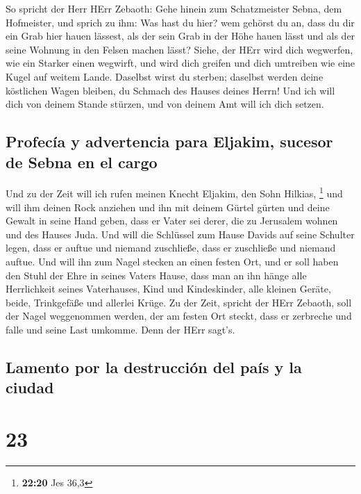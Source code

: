  So spricht der Herr HErr Zebaoth: Gehe hinein zum
Schatzmeister Sebna, dem Hofmeister, und sprich zu ihm: 
Was hast du hier? wem gehörst du an, dass du dir ein Grab hier hauen
lässest, als der sein Grab in der Höhe hauen lässt und als der seine
Wohnung in den Felsen machen lässt?  Siehe, der HErr wird
dich wegwerfen, wie ein Starker einen wegwirft, und wird dich greifen
 und dich umtreiben wie eine Kugel auf weitem Lande.
Daselbst wirst du sterben; daselbst werden deine köstlichen Wagen
bleiben, du Schmach des Hauses deines Herrn!  Und ich
will dich von deinem Stande stürzen, und von deinem Amt will ich dich
setzen.

\hypertarget{profecuxeda-y-advertencia-para-eljakim-sucesor-de-sebna-en-el-cargo}{%
\subsection{Profecía y advertencia para Eljakim, sucesor de Sebna en el
cargo}\label{profecuxeda-y-advertencia-para-eljakim-sucesor-de-sebna-en-el-cargo}}

 Und zu der Zeit will ich rufen meinen Knecht Eljakim,
den Sohn Hilkias, \footnote{\textbf{22:20} Jes 36,3}  und
will ihm deinen Rock anziehen und ihn mit deinem Gürtel gürten und deine
Gewalt in seine Hand geben, dass er Vater sei derer, die zu Jerusalem
wohnen und des Hauses Juda.  Und will die Schlüssel zum
Hause Davids auf seine Schulter legen, dass er auftue und niemand
zuschließe, dass er zuschließe und niemand auftue.  Und
will ihn zum Nagel stecken an einen festen Ort, und er soll haben den
Stuhl der Ehre in seines Vaters Hause,  dass man an ihn
hänge alle Herrlichkeit seines Vaterhauses, Kind und Kindeskinder, alle
kleinen Geräte, beide, Trinkgefäße und allerlei Krüge. 
Zu der Zeit, spricht der HErr Zebaoth, soll der Nagel weggenommen
werden, der am festen Ort steckt, dass er zerbreche und falle und seine
Last umkomme. Denn der HErr sagt's.

\hypertarget{lamento-por-la-destrucciuxf3n-del-pauxeds-y-la-ciudad}{%
\subsection{Lamento por la destrucción del país y la
ciudad}\label{lamento-por-la-destrucciuxf3n-del-pauxeds-y-la-ciudad}}

\hypertarget{section-22}{%
\section{23}\label{section-22}}

